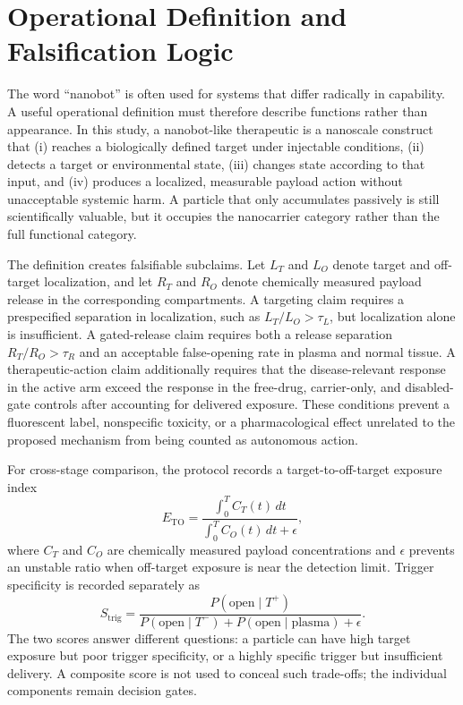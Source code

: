 \documentclass[conference]{IEEEtran}
\begin{document}
\section{Operational Definition and Falsification Logic}
\label{sec:operational}
The word ``nanobot'' is often used for systems that differ radically in capability. A useful operational definition must therefore describe functions rather than appearance. In this study, a nanobot-like therapeutic is a nanoscale construct that (i) reaches a biologically defined target under injectable conditions, (ii) detects a target or environmental state, (iii) changes state according to that input, and (iv) produces a localized, measurable payload action without unacceptable systemic harm. A particle that only accumulates passively is still scientifically valuable, but it occupies the nanocarrier category rather than the full functional category.

The definition creates falsifiable subclaims. Let $L_T$ and $L_O$ denote target and off-target localization, and let $R_T$ and $R_O$ denote chemically measured payload release in the corresponding compartments. A targeting claim requires a prespecified separation in localization, such as $L_T/L_O>\tau_L$, but localization alone is insufficient. A gated-release claim requires both a release separation $R_T/R_O>\tau_R$ and an acceptable false-opening rate in plasma and normal tissue. A therapeutic-action claim additionally requires that the disease-relevant response in the active arm exceed the response in the free-drug, carrier-only, and disabled-gate controls after accounting for delivered exposure. These conditions prevent a fluorescent label, nonspecific toxicity, or a pharmacological effect unrelated to the proposed mechanism from being counted as autonomous action.

For cross-stage comparison, the protocol records a target-to-off-target exposure index
\begin{equation}
E_{\mathrm{TO}}=\frac{\int_0^T C_T(t)\,dt}{\int_0^T C_O(t)\,dt+\epsilon},
\end{equation}
where $C_T$ and $C_O$ are chemically measured payload concentrations and $\epsilon$ prevents an unstable ratio when off-target exposure is near the detection limit. Trigger specificity is recorded separately as
\begin{equation}
S_{\mathrm{trig}}=\frac{P(\mathrm{open}\mid T^+)}{P(\mathrm{open}\mid T^-)+P(\mathrm{open}\mid\mathrm{plasma})+\epsilon}.
\end{equation}
The two scores answer different questions: a particle can have high target exposure but poor trigger specificity, or a highly specific trigger but insufficient delivery. A composite score is not used to conceal such trade-offs; the individual components remain decision gates.
\end{document}
